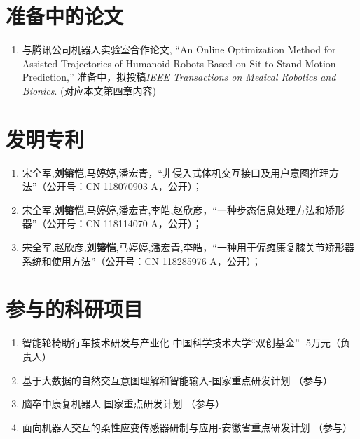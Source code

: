 \begin{publications}
\section*{准备中的论文}
\begin{enumerate}
\item 与腾讯公司机器人实验室合作论文, ``An Online Optimization Method for Assisted Trajectories of Humanoid Robots Based on Sit-to-Stand Motion Prediction,'' 准备中，拟投稿\textit{IEEE Transactions on Medical Robotics and Bionics}. (对应本文第四章内容)
\end{enumerate}

\section*{发明专利}
\begin{enumerate}
\item 宋全军,\textbf{刘镕恺},马婷婷,潘宏青，“非侵入式体机交互接口及用户意图推理方法”（公开号：CN 118070903 A，公开）；
\item 宋全军,\textbf{刘镕恺},马婷婷,潘宏青,李皓,赵欣彦，“一种步态信息处理方法和矫形器”（公开号：CN 118114070 A，公开）；
\item 宋全军,赵欣彦,\textbf{刘镕恺},马婷婷,潘宏青,李皓，“一种用于偏瘫康复膝关节矫形器系统和使用方法”（公开号：CN 118285976 A，公开）；
\end{enumerate}

\section*{参与的科研项目}
\begin{enumerate}
\item 智能轮椅助行车技术研发与产业化-中国科学技术大学“双创基金” -5万元（负责人）
\item 基于大数据的自然交互意图理解和智能输入-国家重点研发计划 （参与）
\item 脑卒中康复机器人-国家重点研发计划 （参与）
\item 面向机器人交互的柔性应变传感器研制与应用-安徽省重点研发计划 （参与）
\end{enumerate}

\end{publications}
